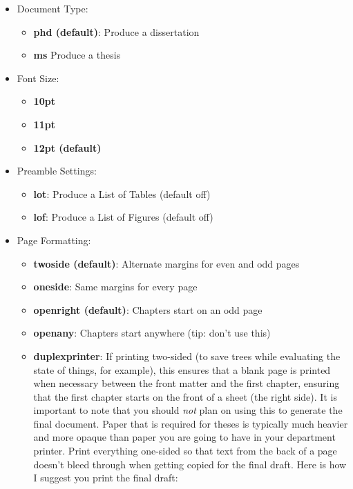 \documentclass[letterpaper,phd,prettyheadings,chaptercenter,parttop]{byumsphd}
\begin{document}
\begin{itemize}
    \item Document Type:
        \begin{itemize}
            \item \textbf{phd (default)}: Produce a dissertation
            \item \textbf{ms} Produce a thesis 
        \end{itemize}
\pagebreak
    \item Font Size:
        \begin{itemize}
            \item \textbf{10pt}
            \item \textbf{11pt}
            \item \textbf{12pt (default)}
        \end{itemize}
    \item Preamble Settings:
        \begin{itemize}
            \item \textbf{lot}: Produce a List of Tables (default off)
            \item \textbf{lof}: Produce a List of Figures (default off)
        \end{itemize}
    \item Page Formatting:
        \begin{itemize}
            \item \textbf{twoside (default)}: Alternate margins for even and odd pages
            \item \textbf{oneside}: Same margins for every page
            \item \textbf{openright (default)}: Chapters start on an odd page
            \item \textbf{openany}: Chapters start anywhere (tip: don't use this)
            \item \textbf{duplexprinter}: If printing two-sided (to save trees while evaluating the state of things, for example), this ensures that a blank page is printed when necessary between the front matter and the first chapter, ensuring that the first chapter starts on the front of a sheet (the right side).  It is important to note that you should \emph{not} plan on using this to generate the final document.  Paper that is required for theses is typically much heavier and more opaque than paper you are going to have in your department printer.  Print everything one-sided so that text from the back of a page doesn't bleed through when getting copied for the final draft.  Here is how I suggest you print the final draft:

\end{itemize}
\end{itemize}
\end{document}
